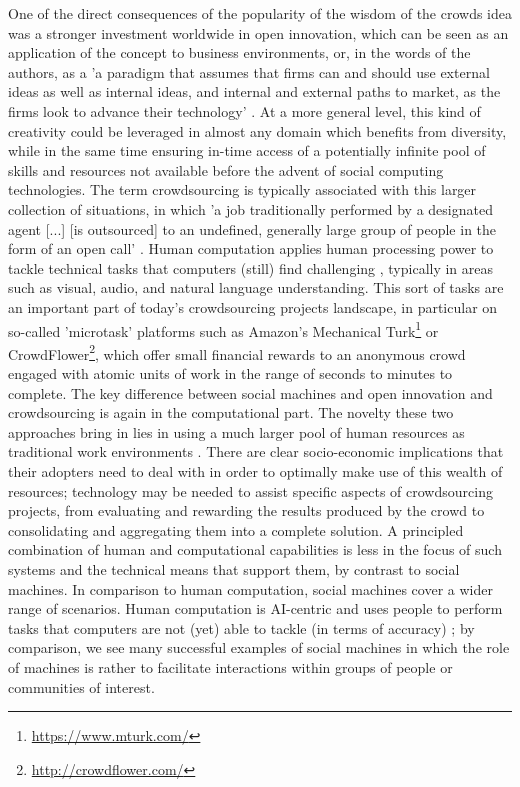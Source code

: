 \documentclass{sig-alternate}
\begin{document}
One of the direct consequences of the popularity of the wisdom of the crowds idea was a stronger investment worldwide in open innovation, which can be seen as an application of the concept to business environments, or, in the words of the authors, as a 'a paradigm that assumes that firms can and should use external ideas as well as internal ideas, and internal and external paths to market, as the firms look to advance their technology' \cite{chesbrough2003}. At a more general level, this kind of creativity could be leveraged in almost any domain which benefits from diversity, while in the same time ensuring in-time access of a potentially infinite pool of skills and resources not available before the advent of social computing technologies. The term crowdsourcing is typically associated with this larger collection of situations, in which 'a job traditionally performed by a designated agent [...] [is outsourced] to an undefined, generally large group of people in the form of an open call' \cite{howe2006crowdsourcing}. Human computation applies human processing power to tackle technical tasks that computers (still) find challenging \cite{von2009human}, typically in areas such as visual, audio, and natural language understanding. This sort of tasks are an important part of today's crowdsourcing projects landscape, in particular on so-called 'microtask' platforms such as Amazon's Mechanical Turk\footnote{\url{https://www.mturk.com/}} or CrowdFlower\footnote{\url{http://crowdflower.com/}}, which offer small financial rewards to an anonymous crowd engaged with atomic units of work in the range of seconds to minutes to complete.  The key difference between social machines and open innovation and crowdsourcing is again in the computational part. The novelty these two approaches bring in lies in using a much larger pool of human resources as traditional work environments \cite{quinn2011human}. There are clear socio-economic implications that their adopters need to deal with in order to optimally make use of this wealth of resources; technology may be needed to assist specific aspects of crowdsourcing projects, from evaluating and rewarding the results produced by the crowd to consolidating and aggregating them into a complete solution. A principled combination of human and computational capabilities is less in the focus of such systems and the technical means that support them, by contrast to social machines. In comparison to human computation, social machines cover a wider range of scenarios. Human computation is AI-centric and uses people to perform tasks that computers are not (yet) able to tackle (in terms of accuracy) \cite{quinn2011human}; by comparison, we see many successful examples of social machines in which the role of machines is rather to facilitate interactions within groups of people or communities of interest.
\end{document}
